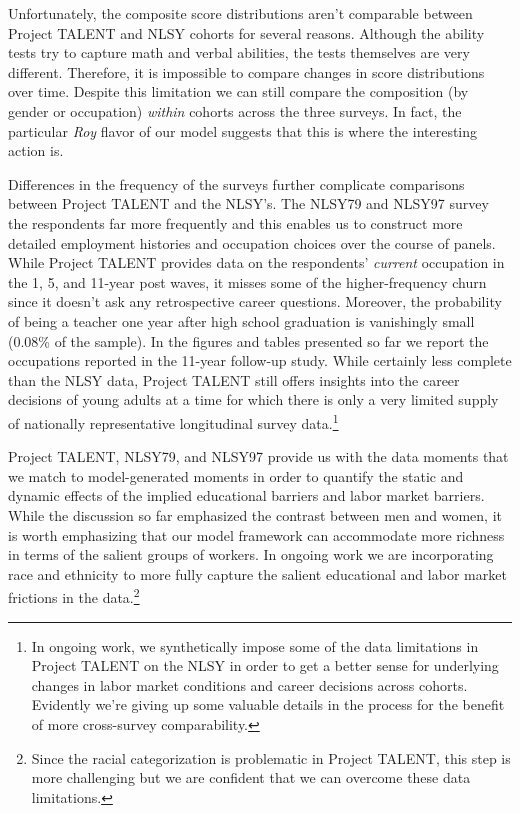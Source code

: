 \documentclass[onehalfspacing,11pt]{article}
\begin{document}
Unfortunately, the composite score distributions aren't comparable between Project TALENT and NLSY cohorts for several reasons. Although the ability tests try to capture math and verbal abilities, the tests themselves are very different. Therefore, it is impossible to compare changes in score distributions over time. Despite this limitation we can still compare the composition (by gender or occupation) {\it within} cohorts across the three surveys. In fact, the particular {\it Roy} flavor of our model suggests that this is where the interesting action is.

Differences in the frequency of the surveys further complicate comparisons between Project TALENT and the NLSY's. The NLSY79 and NLSY97 survey the respondents far more frequently and this enables us to construct more detailed employment histories and occupation choices over the course of panels. While Project TALENT provides data on the respondents' {\it current} occupation in the 1, 5, and 11-year post waves, it misses some of the higher-frequency churn since it doesn't ask any retrospective career questions. Moreover, the probability of being a teacher one year after high school graduation is vanishingly small (0.08\% of the sample). In the figures and tables presented so far we report the occupations reported in the 11-year follow-up study. While certainly less complete than the NLSY data, Project TALENT still offers insights into the career decisions of young adults at a time for which there is only a very limited supply of nationally representative longitudinal survey data.\footnote{In ongoing work, we synthetically impose some of the data limitations in Project TALENT on the NLSY in order to get a better sense for underlying changes in labor market conditions and career decisions across cohorts. Evidently we're giving up some valuable details in the process for the benefit of more cross-survey comparability.}

Project TALENT, NLSY79, and NLSY97 provide us with the data moments that we match to model-generated moments in order to quantify the static and dynamic effects of the implied educational barriers and labor market barriers. While the discussion so far emphasized the contrast between men and women, it is worth emphasizing that our model framework can accommodate more richness in terms of the salient groups of workers. In ongoing work we are incorporating race and ethnicity to more fully capture the salient educational and labor market frictions in the data.\footnote{Since the racial categorization is problematic in Project TALENT, this step is more challenging but we are confident that we can overcome these data limitations.}
\end{document}
